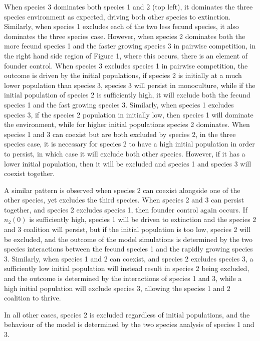 When species 3 dominates both species 1 and 2 (top left), it dominates the three species environment as expected, driving both other species to extinction. Similarly, when species 1 excludes each of the two less fecund species, it also dominates the three species case. However, when species 2 dominates both the more fecund species 1 and the faster growing species 3 in pairwise competition, in the right hand side region of Figure 1, where this occurs, there is an element of founder control. When species 3 excludes species 1 in pairwise competition, the outcome is driven by the initial populations, if species 2 is initially at a much lower population than species 3, species 3 will persist in monoculture, while if the initial population of species 2 is sufficiently high, it will exclude both the fecund species 1 and the fast growing species 3. Similarly, when species 1 excludes species 3, if the species 2 population in initially low, then species 1 will dominate the environment, while for higher initial populations species 2 dominates. When species 1 and 3 can coexist but are both excluded by species 2, in the three species case, it is necessary for species 2 to have a high initial population in order to persist, in which case it will exclude both other species. However, if it has a lower initial population, then it will be excluded and species 1 and species 3 will coexist together.

A similar pattern is observed when species 2 can coexist alongside one of the other species, yet excludes the third species. When species 2 and 3 can persist together, and species 2 excludes species 1, then founder control again occurs. If $n_2(0)$ is sufficiently high, species 1 will be driven to extinction and the species 2 and 3 coalition will persist, but if the initial population is too low, species 2 will be excluded, and the outcome of the model simulations is determined by the two species interactions between the fecund species 1 and the rapidly growing species 3. Similarly, when species 1 and 2 can coexist, and species 2 excludes species 3, a sufficiently low initial population will instead result in species 2 being excluded, and the outcome is determined by the interactions of species 1 and 3, while a high initial population will exclude species 3, allowing the species 1 and 2 coalition to thrive.

In all other cases, species 2 is excluded regardless of initial populations, and the behaviour of the model is determined by the two species analysis of species 1 and 3.

